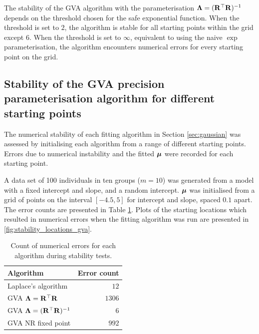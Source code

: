 The stability of the GVA algorithm with the parameterisation ${\boldsymbol \Lambda} =
({\bf R}^\top {\bf R})^{-1}$ depends on the threshold chosen for the safe exponential
function. When the threshold is set to $2$, the algorithm is stable for all
starting points within the grid except $6$. When the threshold is set to
$\infty$, equivalent to using the naive $\exp$ parameterisation, the algorithm
encounters numerical errors for every starting point on the  grid.

\newpage 
	
\subsection{Stability of the GVA precision parameterisation algorithm for different starting points}
The numerical stability of each fitting algorithm in Section \ref{sec:gaussian}
was assessed by initialising each algorithm from a range of different starting
points. Errors due to numerical instability and the fitted ${\boldsymbol \mu}$ were recorded
for each starting point.
		
A data set of 100 individuals in ten groups ($m=10$) was generated from a model
with a fixed intercept and slope, and a random intercept. ${\boldsymbol \mu}$ was
initialised from a grid of points on the interval $[-4.5, 5]$ for intercept and
slope, spaced $0.1$ apart. The error counts are presented in Table
\ref{tab:stability_results}. Plots of the starting locations which resulted in
numerical errors when the fitting algorithm was run are presented in
\ref{fig:stability_locations_gva}.
		
\begin{table}
	\begin{tabular}{|l|r|}
		\hline
		Algorithm                            & Error count \\
		\hline
		Laplace's algorithm                  & $12$          \\
		GVA ${\boldsymbol \Lambda} = {\bf R}^\top {\bf R}$        & $1306$       \\
		GVA ${\boldsymbol \Lambda} = ({\bf R}^\top {\bf R})^{-1}$ & $6$           \\
		GVA NR fixed point                   & $992$         \\
		\hline
	\end{tabular}\bigskip
	\caption{Count of numerical errors for each algorithm during stability tests.}
	\label{tab:stability_results}
\end{table}

